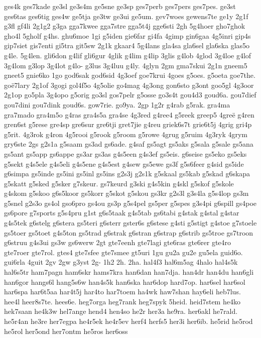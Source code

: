 ges4k
ges7kade
ge3sl
ge3s4m
ge5sne
ge3sp
ges7perb
ges7pers
ges7pes.
ge3st
ges6tas
ges6tig
ges4w
ge5tja
ge3tw
ge3ui
ge5um.
gev7woes
gewens7te
ge1y
2g1f
g3fl
gf4li
2g1g2
g3ga
gga7kwee
gga7stre
gga5t4j
gge6sti
2gh
5g4hoer
gho7ghok
gho4l
5gholf
g4hs.
ghu6moe
1gi
g5iden
gie6far
gi4fa
4gimp
gin6gaa
4g5inri
gip4s
gip7siet
gis7enti
gi5tra
git5sw
2g1k
gkaar4
5g4lans
gla4sa
gla6sel
gla6ska
glas5o
g4le.
5g4len.
gli6don
g4lif
gli6gur
4glik
g4lim
g4lip
3glis
g4lob
4glod
3g4loe
g4lof
3g4lom
g3lop
3g4lot
g4lo-
g3lus
3g4luu
g4ly.
4glyn
2gm
gma7skui
2g1n
gneem5
gneet5
gnie6ko
1go
god6sak
god6sid
4g3oef
goe7krui
4goes
g5oes.
g5oeta
goe7the.
goë7lary
2g1of
3gogi
gol4f5o
4g5olie
go4mag
4g3ong
gon6sto
g3ont
goo5gl
4g3oor
2g1op
go5pla
3g4opo
g5orig
go3sl
gos7pelr
g5osse
go3s4t
gou4d3
goud6a.
gou7dief
gou7dini
gou7dink
goud6s.
gow7rie.
go9ya.
2gp
1g2r
g4rab
g5rak.
gra4ma
gra7mado
gra4m5o
g4ras
gra4s5a
gra4se
4g3red
g4ree4
g5reek
greep5
4greë
g4ren
gren6st
g5rese
gre4sp
gre6sur
gre6tji
gret7jie
g4reu
griek6s7t
grie6t5j
4grig
gri4p
g5rit.
4g3rok
g4ron
4g5rooi
g5rook
g5room
g5rowe
4grug
g5ruim
4g3ryk
4grym
gry6ste
2gs
g2s1a
g5saam
gs3ad
gs6ade.
g4saf
gs5agt
gs5aks
g5sala
g5sale
gs5ana
gs5ant
gs5app
gs6appe
gs3ar
gs3as
g4s5een
g4s3ef
gs5eis.
g6seise
gs5eko
gs5eks
g5sekt
g4s5ele
g4s5eli
g4s5ene
g4s5est
g4sew
gs5ewe
gs3f
g5s6feer
g4sid
gs5ide
g6simpa
gs5inde
gs5ini
gs5inl
gs5ins
g2s3j
g2s1k
g5skaal
gs5kab
g5skad
g6skapa
g5skatt
g5sked
g5sker
g7skeur.
gs7keurd
g3ski
g4s5kin
g4skl
g5skof
g5skole
g4skom
g5skoo
g6s5koor
gs5korr
g5skot
g5skou
gs3kr
g2s3l
g3s4la
g5s4lop
gs3m
g5snel
g2s3o
gs4ol
gso6pro
gs4ou
gs3p
g5s4pel
gs5per
g5spes
g3s4pi
g6spill
gs4poe
gs6pore
g7sports
g5s4pru
g1st
g6s5taak
g4s5tab
gs6tabi
g4stak
g4stal
g4star
g4s5tek
g6stelg
g6stera
gs5teri
g6sterr
gster6s
g6stese
g4sti
g5stigt
g4stoe
g7stoele
gs5toer
gs5toet
g4s5ton
gs5trad
g6strak
g6stran
g6strap
g6strib
gs5troe
gs7troon
g6struu
g4s3ui
gs3w
gs6werw
2gt
gte7eenh
gte7lagi
gte6ras
gte6rer
gte4ro
gte7roer
gte7rol.
gtes4
gte7sfee
gte7smee
gt5uri
1gu
gu2a
gu2e
gu5ela
guid6o.
gui6rla
4guit
2gv
2gw
g3yst
2g-
1h2
2h.
2ha.
hal4f3
hal6m5ag
4halo
hal4s5k
hal6s5tr
ham7pagn
ham6skr
hams7kra
han6dan
han7dja.
han4dr
han4du
han6gli
han6gor
hangs6l
hang5s6w
han4s5k
han6ska
har6dop
hard7op.
har6sel
har6sol
har6spa
har6t5aa
har4t5j
har4to
har7toem
ha4wk
haw7shan
hay6eli
heb7lus.
hee4l
heer8s7te.
hees6e.
heg7orga
heg7rank
heg7spyk
5heid.
heid7stem
he4ko
hek7saan
he4k3w
hel7ange
hend4
hen4so
he2r
her3a
he9ra.
her6akl
he7rald.
he5r4an
he3re
her7egpa
he4r5ek
he4r5ev
herf4
herfs5
her3i
her6ib.
he5rid
he5rod
he5rol
her5ond
her7ontm
he5ros
her6oss
